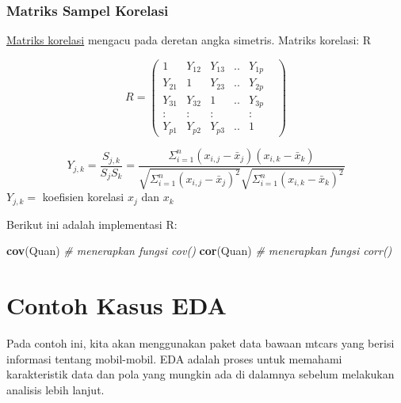 \documentclass[
]{book}
\newenvironment{Shaded}{\begin{snugshade}}{\end{snugshade}}
\newcommand{\CommentTok}[1]{\textcolor[rgb]{0.56,0.35,0.01}{\textit{#1}}}
\newcommand{\FunctionTok}[1]{\textcolor[rgb]{0.13,0.29,0.53}{\textbf{#1}}}
\newcommand{\NormalTok}[1]{#1}
\begin{document}
\hypertarget{matriks-sampel-korelasi}{%
\subsubsection*{Matriks Sampel Korelasi}\label{matriks-sampel-korelasi}}

\href{http://users.stat.umn.edu/~helwig/notes/datamat-Notes.pdf}{Matriks korelasi} mengacu pada deretan angka simetris.
Matriks korelasi: R

\[R = \begin{pmatrix}    1   & Y_{12} & Y_{13} & .. & Y_{1p}\\
                      Y_{21} &    1   & Y_{23} & .. & Y_{2p}\\ 
                      Y_{31} & Y_{32} &    1   & .. & Y_{3p}\\  
                         :   &    :   &    :   &    &   :   \\
                      Y_{p1} & Y_{p2} & Y_{p3} & .. &   1   &  
       \end{pmatrix}\]

\[Y_{j,k}=\frac{S_{j,k}}{S_jS_k}=\frac{\Sigma^{n}_{i=1}(x_{i,j}-\bar{x}_j)(x_{i,k}-\bar{x}_k)}{\sqrt{\Sigma^n_{i=1}{(x_{i,j}-\bar{x}_j)^2}}\sqrt{\Sigma^n_{i=1}(x_{i,k}-\bar{x}_k)^2}}\]
\(Y_{j,k}=\) koefisien korelasi \(x_j\) dan \(x_k\)

Berikut ini adalah implementasi R:

\begin{Shaded}
\begin{Highlighting}[]
\FunctionTok{cov}\NormalTok{(Quan)                                           }\CommentTok{\# menerapkan fungsi \textasciigrave{}cov()\textasciigrave{}}
\FunctionTok{cor}\NormalTok{(Quan)                                           }\CommentTok{\# menerapkan fungsi \textasciigrave{}corr()\textasciigrave{}}
\end{Highlighting}
\end{Shaded}

\hypertarget{contoh-kasus-eda}{%
\section{Contoh Kasus EDA}\label{contoh-kasus-eda}}

Pada contoh ini, kita akan menggunakan paket data bawaan mtcars yang berisi informasi tentang mobil-mobil. EDA adalah proses untuk memahami karakteristik data dan pola yang mungkin ada di dalamnya sebelum melakukan analisis lebih lanjut.
\end{document}
